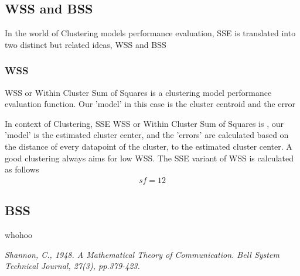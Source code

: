 \documentclass[12pt]{article}
\begin{document}
		 	\subsection*{WSS and BSS}
		 		In the world of Clustering models performance evaluation, SSE is translated into two distinct but related ideas, WSS and BSS
		 		\subsubsection{WSS}
		 			WSS or  Within Cluster Sum of Squares is a clustering model performance evaluation function. Our 'model' in this case is the cluster centroid and the error 
		 		
		 		In context of Clustering, SSE WSS or Within Cluster Sum of Squares is , our 'model' is the estimated cluster center, and the 'errors' are calculated based on the distance of every datapoint of the cluster, to the estimated cluster center. A good clustering always aims for low WSS. The SSE variant of WSS is calculated as follows
		 		\begin{align}
sf=12					
		 		\end{align}
			\subsection*{BSS}
				whohoo
		
	
	
	 
	
	
		
	
	\pagebreak
	\begin{thebibliography}{1}	
		\textit{Shannon, C., 1948. A Mathematical Theory of Communication. Bell System Technical Journal, 27(3), pp.379-423.}
		
	\end{thebibliography}
\end{document}
